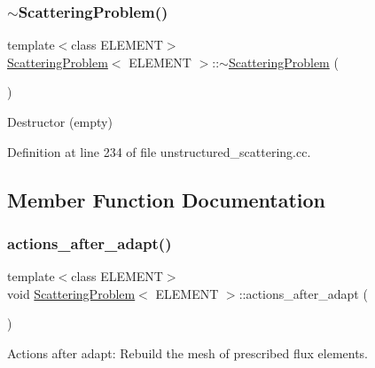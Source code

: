 \subsubsection{\texorpdfstring{$\sim$\+Scattering\+Problem()}{~ScatteringProblem()}\hspace{0.1cm}{\footnotesize\ttfamily [2/2]}}
{\footnotesize\ttfamily template$<$class E\+L\+E\+M\+E\+NT$>$ \\
\hyperlink{classScatteringProblem}{Scattering\+Problem}$<$ E\+L\+E\+M\+E\+NT $>$\+::$\sim$\hyperlink{classScatteringProblem}{Scattering\+Problem} (\begin{DoxyParamCaption}{ }\end{DoxyParamCaption})\hspace{0.3cm}{\ttfamily [inline]}}



Destructor (empty) 



Definition at line 234 of file unstructured\+\_\+scattering.\+cc.



\subsection{Member Function Documentation}
\mbox{\label{classScatteringProblem_a13d8f85e74666c260de7364917359ed5}} 
\subsubsection{\texorpdfstring{actions\+\_\+after\+\_\+adapt()}{actions\_after\_adapt()}\hspace{0.1cm}{\footnotesize\ttfamily [1/2]}}
{\footnotesize\ttfamily template$<$class E\+L\+E\+M\+E\+NT$>$ \\
void \hyperlink{classScatteringProblem}{Scattering\+Problem}$<$ E\+L\+E\+M\+E\+NT $>$\+::actions\+\_\+after\+\_\+adapt (\begin{DoxyParamCaption}{ }\end{DoxyParamCaption})}



Actions after adapt\+: Rebuild the mesh of prescribed flux elements. 

\mbox{\label{classScatteringProblem_a13d8f85e74666c260de7364917359ed5}} 
